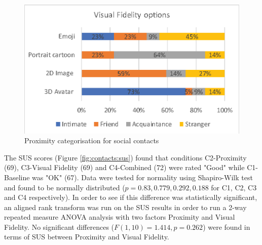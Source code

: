
\begin{figure}[ht]
    \centering
    \includegraphics[width=0.8\linewidth]{images/41-visualising-mgia17/analysis-images-01.eps}
    \caption{Proximity categorisation for social contacts}
    \label{fig:contacts:proximity}
\end{figure}

The SUS scores (Figure \ref{fig:contacts:sus}) found that conditions C2-Proximity (69), C3-Visual Fidelity (69) and C4-Combined (72) were rated "Good" while C1-Baseline was "OK" (67). Data were tested for normality using Shapiro-Wilk test and found to be normally distributed ($p=0.83, 0.779, 0.292, 0.188$ for C1, C2, C3 and C4 respectively). In order to see if this difference was statistically significant, an aligned rank transform was run on the SUS results in order to run a 2-way repeated measure ANOVA analysis with two factors Proximity and Visual Fidelity. No significant differences ($F(1, 10)=1.414,p=0.262$) were found in terms of SUS between Proximity and Visual Fidelity. 

